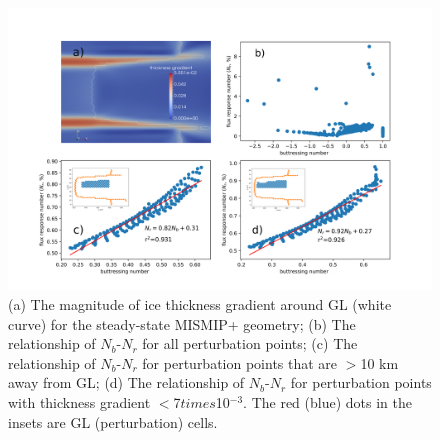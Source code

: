 \documentclass[review,oneside]{igs}
\begin{document}
\begin{figure}
\centering
\includegraphics[width=1\linewidth]{figs/fig2.pdf}
    \caption{(a) The magnitude of ice thickness gradient around GL (white curve) for the steady-state MISMIP+ geometry; (b) The relationship of $N_b$-$N_r$ for all perturbation points; (c) The relationship of $N_b$-$N_r$ for perturbation points that are $>$10 km away from GL; (d) The relationship of $N_b$-$N_r$ for perturbation points with thickness gradient $<$7$times$10$^{-3}$. The red (blue) dots in the insets are GL (perturbation) cells.}
\label{fig2}
\end{figure}
\end{document}
